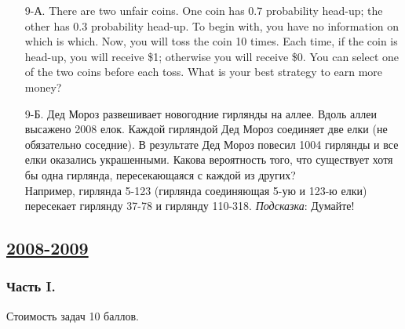 \begin{enumerate}
\item[9-А.] There are two unfair coins. One coin has $0.7$ probability head-up;
the other has $0.3$ probability head-up. To begin with, you have no information
on which is which. Now, you will toss the coin 10 times. Each time, if the coin is
head-up, you will receive \$1; otherwise you will receive \$0. You can select one
of the two coins before each toss. What is your best strategy to earn more money?
\item[9-Б.] Дед Мороз развешивает новогодние гирлянды на аллее. Вдоль аллеи высажено
2008 елок. Каждой гирляндой Дед Мороз соединяет две елки (не обязательно соседние).
В результате Дед Мороз повесил 1004 гирлянды и все елки оказались украшенными.
Какова вероятность того, что существует хотя бы одна гирлянда, пересекающаяся с
каждой из других? \\
Например, гирлянда 5-123 (гирлянда соединяющая 5-ую и 123-ю елки) пересекает гирлянду
37-78 и гирлянду 110-318.
\emph{Подсказка}: Думайте!
\end{enumerate}



\newpage
\subsection[2008-2009]{\hyperref[sec:sol_kr_01_2008_2009]{2008-2009}}
\label{sec:kr_01_2008_2009}

\subsubsection*{Часть I.}

Стоимость задач 10 баллов.

